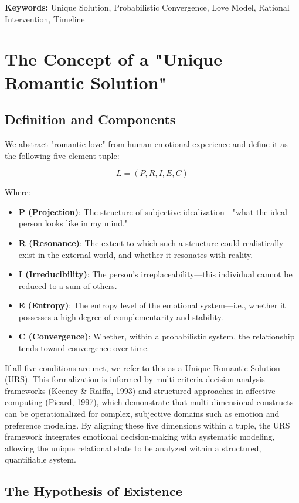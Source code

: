 \documentclass{article}
\begin{document}
\textbf{Keywords:} Unique Solution, Probabilistic Convergence, Love Model, Rational Intervention, Timeline

\section{The Concept of a "Unique Romantic Solution"}

\subsection{Definition and Components}

We abstract "romantic love" from human emotional experience and define it as the following five-element tuple:

\[ L = (P, R, I, E, C) \]

Where:
\begin{itemize}
\item \textbf{P (Projection)}: The structure of subjective idealization—"what the ideal person looks like in my mind."
\item \textbf{R (Resonance)}: The extent to which such a structure could realistically exist in the external world, and whether it resonates with reality.
\item \textbf{I (Irreducibility)}: The person’s irreplaceability—this individual cannot be reduced to a sum of others.
\item \textbf{E (Entropy)}: The entropy level of the emotional system—i.e., whether it possesses a high degree of complementarity and stability.
\item \textbf{C (Convergence)}: Whether, within a probabilistic system, the relationship tends toward convergence over time.
\end{itemize}

If all five conditions are met, we refer to this as a Unique Romantic Solution (URS). This formalization is informed by multi-criteria decision analysis frameworks (Keeney \& Raiffa, 1993) and structured approaches in affective computing (Picard, 1997), which demonstrate that multi-dimensional constructs can be operationalized for complex, subjective domains such as emotion and preference modeling. By aligning these five dimensions within a tuple, the URS framework integrates emotional decision-making with systematic modeling, allowing the unique relational state to be analyzed within a structured, quantifiable system.

\subsection{The Hypothesis of Existence}
\end{document}
